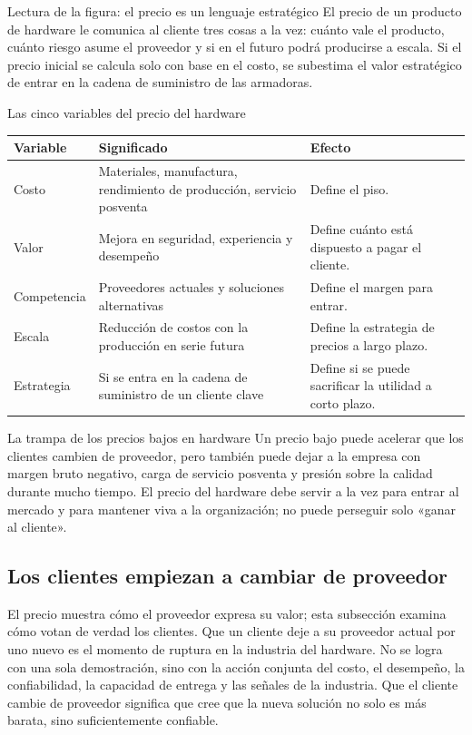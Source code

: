\begin{knowledgebox}{Lectura de la figura: el precio es un lenguaje estratégico}
El precio de un producto de hardware le comunica al cliente tres cosas a la vez: cuánto vale el producto, cuánto riesgo asume el proveedor y si en el futuro podrá producirse a escala. Si el precio inicial se calcula solo con base en el costo, se subestima el valor estratégico de entrar en la cadena de suministro de las armadoras.
\end{knowledgebox}

\begin{knowledgebox}{Las cinco variables del precio del hardware}
\begin{tabularx}{\textwidth}{p{}p{}X}
\toprule
Variable & Significado & Efecto \\
\midrule
Costo & Materiales, manufactura, rendimiento de producción, servicio posventa & Define el piso. \\
Valor & Mejora en seguridad, experiencia y desempeño & Define cuánto está dispuesto a pagar el cliente. \\
Competencia & Proveedores actuales y soluciones alternativas & Define el margen para entrar. \\
Escala & Reducción de costos con la producción en serie futura & Define la estrategia de precios a largo plazo. \\
Estrategia & Si se entra en la cadena de suministro de un cliente clave & Define si se puede sacrificar la utilidad a corto plazo. \\
\bottomrule
\end{tabularx}
\end{knowledgebox}

\begin{warningbox}{La trampa de los precios bajos en hardware}
Un precio bajo puede acelerar que los clientes cambien de proveedor, pero también puede dejar a la empresa con margen bruto negativo, carga de servicio posventa y presión sobre la calidad durante mucho tiempo. El precio del hardware debe servir a la vez para entrar al mercado y para mantener viva a la organización; no puede perseguir solo «ganar al cliente».
\end{warningbox}

\subsection{Los clientes empiezan a cambiar de proveedor}

El precio muestra cómo el proveedor expresa su valor; esta subsección examina cómo votan de verdad los clientes. Que un cliente deje a su proveedor actual por uno nuevo es el momento de ruptura en la industria del hardware. No se logra con una sola demostración, sino con la acción conjunta del costo, el desempeño, la confiabilidad, la capacidad de entrega y las señales de la industria. Que el cliente cambie de proveedor significa que cree que la nueva solución no solo es más barata, sino suficientemente confiable.

